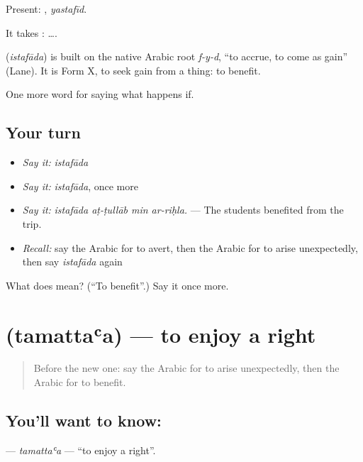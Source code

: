 Present: , \emph{yastafīd}.

It takes :   ….

\begin{cousinweb}
\textbf{} (\emph{istafāda}) is built on the native Arabic root \emph{f-y-d}, \textquotedblleft{}to accrue, to come as gain\textquotedblright{} (Lane). It is Form X, to seek gain from a thing: to benefit.
\end{cousinweb}

\begin{grammarlens}[title={What you've built}]
One more word for saying what happens if.
\end{grammarlens}

\subsection*{Your turn}
\begin{itemize}
\raggedright
  \item \emph{Say it:} \emph{istafāda}
  \item \emph{Say it:} \emph{istafāda}, once more
  \item \emph{Say it:} \emph{istafāda aṭ-ṭullāb min ar-riḥla.} — The students benefited from the trip.
  \item \emph{Recall:} say the Arabic for to avert, then the Arabic for to arise unexpectedly, then say \emph{istafāda} again
\end{itemize}

\begin{tcolorbox}[breakable,colback=teal!4,colframe=teal!35!black,title={Before you move on}]
What does  mean? (\textquotedblleft{}To benefit\textquotedblright{}.) Say it once more.
\end{tcolorbox}
\section[\texorpdfstring{\ar{تمتع} (tamattaʿa)}{تمتع (tamattaʿa)}]{ (tamattaʿa) — to enjoy a right}

\label{lesson:AR-C408-tamattaa}



\begin{quote}
Before the new one: say the Arabic for to arise unexpectedly, then the Arabic for to benefit.
\end{quote}

\subsection*{You'll want to know: }
\textbf{} — \emph{tamattaʿa} — \textquotedblleft{}to enjoy a right\textquotedblright{}.

